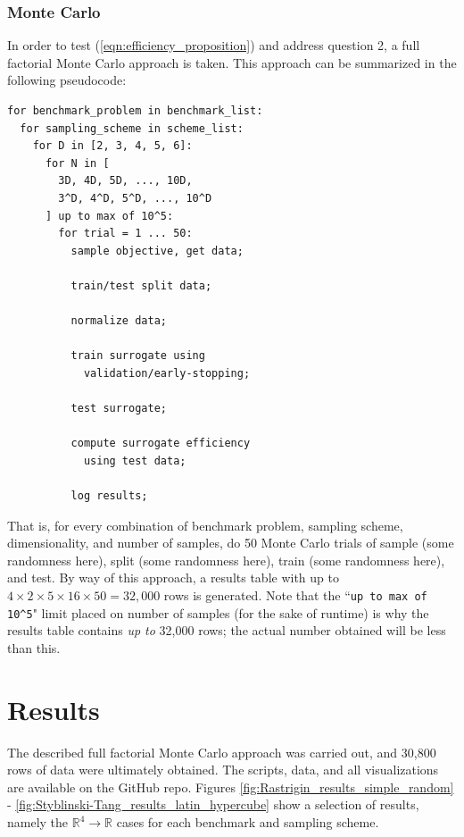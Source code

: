 \documentclass[conference]{IEEEtran}
\begin{document}
\subsubsection{Monte Carlo}

In order to test (\ref{eqn:efficiency_proposition}) and address question 2, a full factorial Monte Carlo approach is taken. This approach can be summarized in the following pseudocode:

\newpage
\begin{verbatim}
for benchmark_problem in benchmark_list:
  for sampling_scheme in scheme_list:
    for D in [2, 3, 4, 5, 6]:
      for N in [
      	3D, 4D, 5D, ..., 10D,
      	3^D, 4^D, 5^D, ..., 10^D
      ] up to max of 10^5:
        for trial = 1 ... 50:
          sample objective, get data;
      
          train/test split data;
      
          normalize data;
      
          train surrogate using
            validation/early-stopping;
        
          test surrogate;
        
          compute surrogate efficiency
            using test data;
        
          log results;
\end{verbatim}

\noindent That is, for every combination of benchmark problem, sampling scheme, dimensionality, and number of samples, do 50 Monte Carlo trials of sample (some randomness here), split (some randomness here), train (some randomness here), and test. By way of this approach, a results table with up to $4\times 2\times 5\times 16\times 50 = 32,000$ rows is generated. Note that the ``\texttt{up to max of 10\^{}5}" limit placed on number of samples (for the sake of runtime) is why the results table contains \textit{up to} 32,000 rows; the actual number obtained will be less than this.

\section{Results}

The described full factorial Monte Carlo approach was carried out, and 30,800 rows of data were ultimately obtained. The scripts, data, and all visualizations are available on the GitHub repo. Figures \ref{fig:Rastrigin_results_simple_random} - \ref{fig:Styblinski-Tang_results_latin_hypercube} show a selection of results, namely the $\mathbb{R}^4\to\mathbb{R}$ cases for each benchmark and sampling scheme.
\end{document}
